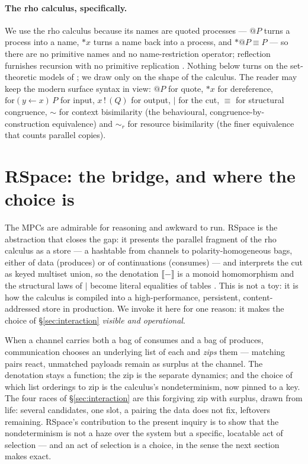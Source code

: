 \documentclass[11pt]{article}
\theoremstyle{definition}
\theoremstyle{plain}
\theoremstyle{remark}
\newcommand{\deref}{{*}}
\newcommand{\inn}[3]{\mathrm{for}(#1 \leftarrow #2)\,#3}
\newcommand{\out}[2]{#1\,!\,(#2)}
\newcommand{\rcong}{\equiv}
\newcommand{\bisim}{\sim}
\newcommand{\rbisim}{\sim_{r}}
\newcommand{\sem}[1]{\llbracket #1 \rrbracket}
\newcommand{\Cut}{\mid}
\begin{document}
\paragraph{The rho calculus, specifically.}
We use the rho calculus because its names are quoted processes --- $@P$ turns a
process into a name, $\deref x$ turns a name back into a process, and
$\deref @P \equiv P$ --- so there are no primitive names and no name-restriction
operator; reflection furnishes recursion with no primitive replication \cite{rho}.
Nothing below turns on the set-theoretic models of \cite{qcs,knot}; we draw only on
the shape of the calculus. The reader may keep the modern surface syntax in view:
$@P$ for quote, $\deref x$ for dereference, $\inn{y}{x}{P}$ for input, $\out{x}{Q}$
for output, $\Cut$ for the cut, $\rcong$ for structural congruence, $\bisim$ for
context bisimilarity (the behavioural, congruence-by-construction equivalence) and
$\rbisim$ for resource bisimilarity (the finer equivalence that counts parallel
copies).

\section{RSpace: the bridge, and where the choice is}\label{sec:rspace}

The MPCs are admirable for reasoning and awkward to run. RSpace is the abstraction
that closes the gap: it presents the parallel fragment of the rho calculus as a
store --- a hashtable from channels to polarity-homogeneous bags, either of data
(produces) or of continuations (consumes) --- and interprets the cut as keyed
multiset union, so the denotation $\sem{-}$ is a monoid homomorphism and the
structural laws of $\Cut$ become literal equalities of tables \cite{qcs}. This is
not a toy: it is how the calculus is compiled into a high-performance, persistent,
content-addressed store in production. We invoke it here for one reason: it makes
the choice of \S\ref{sec:interaction} \emph{visible and operational}.

When a channel carries both a bag of consumes and a bag of produces, communication
chooses an underlying list of each and \emph{zips} them --- matching pairs react,
unmatched payloads remain as surplus at the channel. The denotation stays a
function; the zip is the separate dynamics; and the choice of which list orderings
to zip is the calculus's nondeterminism, now pinned to a key. The four races of
\S\ref{sec:interaction} are this forgiving zip with surplus, drawn from life:
several candidates, one slot, a pairing the data does not fix, leftovers remaining.
RSpace's contribution to the present inquiry is to show that the nondeterminism is
not a haze over the system but a specific, locatable act of selection --- and an act
of selection is a choice, in the sense the next section makes exact.
\end{document}
